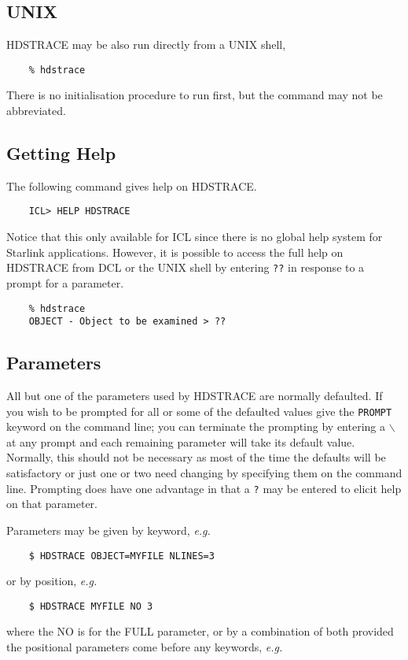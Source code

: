 \subsection{UNIX}
{\footnotesize HDSTRACE} may be also run directly from a UNIX shell,
\small
\begin{verbatim}
    % hdstrace
\end{verbatim}
\normalsize
There is no initialisation procedure to run first, but the command may
not be abbreviated.

\subsection{Getting Help}
The following command gives help on HDSTRACE.
\small
\begin{verbatim}
    ICL> HELP HDSTRACE
\end{verbatim}
\normalsize
Notice that this only available for ICL since there is no global help
system for Starlink applications.  However, it is possible to access
the full help on {\footnotesize HDSTRACE} from DCL or the UNIX shell by
entering {\tt ??} in response to a prompt for a parameter.

\small
\begin{verbatim}
    % hdstrace
    OBJECT - Object to be examined > ??
\end{verbatim}
\normalsize
\subsection{Parameters}
All but one of the parameters used by {\footnotesize HDSTRACE} are
normally defaulted.  If you wish to be prompted for all or some of the
defaulted values give the {\tt PROMPT} keyword on the command line; you
can terminate the prompting by entering a {\tt $\backslash$} at any
prompt and each remaining parameter will take its default value.
Normally, this should not be necessary as most of the time the defaults
will be satisfactory or just one or two need changing by specifying them
on the command line. Prompting does have one advantage in that a {\tt ?}
may be entered to elicit help on that parameter.

Parameters may be given by keyword, {\it e.g.}\
\small
\begin{verbatim}
    $ HDSTRACE OBJECT=MYFILE NLINES=3
\end{verbatim}
\normalsize
or by position, {\it e.g.}\

\small
\begin{verbatim}
    $ HDSTRACE MYFILE NO 3
\end{verbatim}
\normalsize
where the NO is for the FULL parameter, or by a combination of both
provided the positional parameters come before any keywords, {\it e.g.}\

